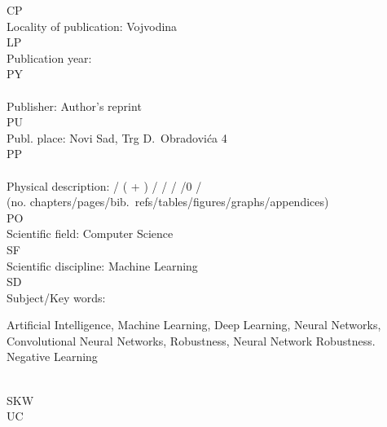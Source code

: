 \begin{tabbing}
    CP                       \>                               \\
    Locality of publication: \> Vojvodina                     \\
    LP                       \>                               \\
    Publication year:                                  \\
    PY                       \>                               \\
    \>                               \\
    Publisher:               \> Author's reprint              \\
    PU                       \>                               \\
    Publ. place:             \> Novi Sad, Trg D.~Obradovića 4 \\
    PP                       \>                               \\
    \>                               \\
    Physical description:    \> %
/ ( + )%
/%
/\totaltables%
/\totalfigures%
/0%
/\\
    \hspace*{\parindent}
    (no. chapters/pages/bib.~refs/tables/figures/graphs/appendices)\> \\
    PO                       \>                               \\
    Scientific field:        \> Computer Science              \\
    SF                       \>                               \\
    Scientific discipline:   \> Machine Learning  \\
    SD                       \>                               \\
    Subject/Key words: \>
    \begin{minipage}[t]{.65\textwidth}
      Artificial Intelligence, Machine Learning, Deep Learning,
      Neural Networks, Convolutional Neural Networks, Robustness,
      Neural Network Robustness. Negative Learning
    \end{minipage}                                          \\
  SKW                      \>                               \\
  UC                       \>                               \\

\end{tabbing}
